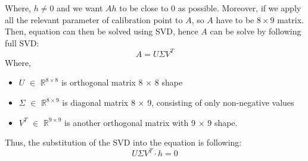 \documentclass{rithy-thesis}
\begin{document}
\noindent Where, $h \neq 0$ and we want $Ah$ to be close to 0 as possible. Moreover, if we apply all the relevant parameter of calibration point to $A$, so $A$ have to be $8\times9$ matrix. Then, equation can then be solved using SVD, hence $A$ can be solve by following full SVD:
\begin{equation}
   A = U \Sigma V^{T}
\end{equation}
Where,
\begin{itemize}
\setlength{\itemsep}{0pt}
    \item $U$ $\in$ $\mathbb{R}^{8\times8}$ is orthogonal matrix 8 × 8 shape
    \item $\Sigma$ $\in$ $\mathbb{R}^{8\times9}$ is diagonal matrix 8 × 9, consisting of only non-negative values
    \item $V^{T}$ $\in$ $\mathbb{R}^{9\times9}$ is another orthogonal matrix with 9 × 9 shape.
\end{itemize}
Thus, the substitution of the SVD into the equation is following:
\begin{equation}
    U\Sigma V^{T}\cdot h = 0
\end{equation}


\renewcommand\bibname{REFERENCES}


\end{document}
